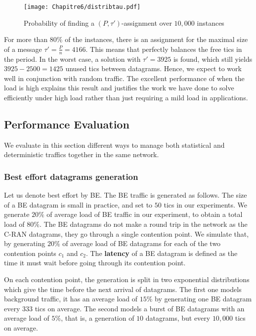     \begin{figure}
       \begin{center}
      \texttt{[image: Chapitre6/distribtau.pdf]}
      \end{center}
      \caption{Probability of finding a $(P,\tau')$-assignment over $10,000$ instances}
      \label{fig:spacetau}   
     \end{figure}   

	For more than $80\%$ of the instances, there is an assignment for the maximal size of a message $\tau' = \frac{P}{n} = 4166$. This means that \SPMLS perfectly balances the free tics in the period. In the worst case, a solution with $\tau' = 3925$ is found, which still yields $3925 - 2500 = 1425$ unused tics between datagrams. Hence, we expect \SPMLS to work well in conjunction with random traffic.
	The excellent performance of \PMLS when the load is high explains this result and justifies the work we have done to solve \pall efficiently under high load rather than just requiring a mild load in applications. 

    \subsection{Performance Evaluation}
    
    We evaluate in this section different ways to manage both statistical and deterministic traffics together in the same network.
 
    \subsubsection{Best effort datagrams generation}
    
    Let us denote best effort by BE. The BE traffic is generated as follows. The size of a BE datagram is small in practice, and set to $50$ tics in our experiments. We generate $20\%$ of average load of BE traffic in our experiment, to obtain a total load of $80\%$. The BE datagrams do not make a round trip in the network as the C-RAN datagrams, they go through a single contention point. 
    We simulate that, by generating $20\%$ of average load of BE datagrams for each of the two contention points $c_1$ and $c_2$. The \textbf{latency} of a BE datagram is defined as the time it must wait before going
    through its contention point.

    On each contention point, the generation is split in two exponential distributions which give the time before the next arrival of datagrams. The first one models background traffic, it has an average load of $15\%$ by generating one BE datagram every $333$ tics on average. The second models a burst of BE datagrams with an average load of $5\%$, that is, a generation of $10$ datagrams, but every $10,000$ tics on average. 
   
